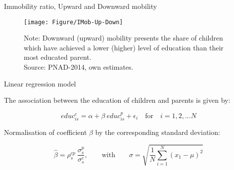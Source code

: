 \documentclass{beamer}
\begin{document}
\begin{frame} {Immobility ratio, Upward and Downward mobility}
\begin{figure}[htb]
\centering
\texttt{[image: Figure/IMob-Up-Down]}
\begin{minipage}{0.82\textwidth} %
{\fontsize{5}{1}\selectfont 
\vspace*{-2mm}
Note: Downward (upward) mobility presents the share of children which have achieved a lower (higher) level of education than their most educated parent.\\
Source: PNAD-2014, own estimates.\par}
\end{minipage}
\end{figure}
\end{frame}




\begin{frame} {Linear regression model}
\begin{itemize}
{\footnotesize\item The association between the education of children and parents is given by:}

\begin{equation} \label{eq:OLS}
educ^c_{is}=\alpha+\beta \: educ^p_{is}+\epsilon_i \quad \textrm{for} \quad i=1,2,...N 
\end{equation}

\hfill \break
{\footnotesize\item Normalisation of coefficient $\beta$ by the corresponding standard deviation:}

\begin{equation} \label{eq:Beta}
\hat{\beta} = \rho_s^{cp} \: \frac{\sigma^p_s}{\sigma^c_s}, \qquad \textrm{with} \qquad \sigma=\sqrt{\frac{1}{N}\sum_{i=1}^{N}(x_1-\mu)^2}
\end{equation}
\end{itemize}
\end{frame}
\end{document}
